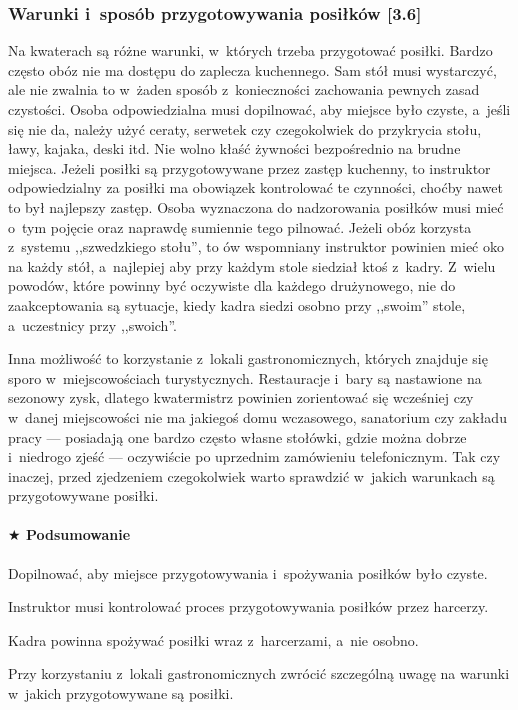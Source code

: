 \documentclass[a5paper,10pt,titlepage,twoside]{article}
\newcommand*{\thecheckbox}{\hss$\Box$} %
\newenvironment*{checklist}
{\list{}{%
\renewcommand*{\makelabel}[1]{\thecheckbox}}}
{\endlist}
\begin{document}
\subsubsection{Warunki i~sposób przygotowywania posiłków [3.6]}
Na kwaterach są różne warunki, w~których trzeba przygotować posiłki. Bardzo często obóz nie ma dostępu do zaplecza kuchennego. Sam stół musi wystarczyć, ale nie zwalnia to w~żaden sposób z~konieczności zachowania pewnych zasad czystości. Osoba odpowiedzialna musi dopilnować, aby miejsce było czyste, a~jeśli się nie da, należy użyć ceraty, serwetek czy czegokolwiek do przykrycia stołu, ławy, kajaka, deski itd. Nie wolno kłaść żywności bezpośrednio na brudne miejsca. Jeżeli posiłki są przygotowywane przez zastęp kuchenny, to instruktor odpowiedzialny za posiłki ma obowiązek kontrolować te czynności, choćby nawet to był najlepszy zastęp. Osoba wyznaczona do nadzorowania posiłków musi mieć o~tym pojęcie oraz naprawdę sumiennie tego pilnować. Jeżeli obóz korzysta z~systemu ,,szwedzkiego stołu'', to ów wspomniany instruktor powinien mieć oko na każdy stół, a~najlepiej aby przy każdym stole siedział ktoś z~kadry. Z~wielu powodów, które powinny być oczywiste dla każdego drużynowego, nie do zaakceptowania są sytuacje, kiedy kadra siedzi osobno przy ,,swoim'' stole, a~uczestnicy przy ,,swoich''.

Inna możliwość to korzystanie z~lokali gastronomicznych, których znajduje się sporo w~miejscowościach turystycznych. Restauracje i~bary są nastawione na sezonowy zysk, dlatego kwatermistrz powinien zorientować się wcześniej czy w~danej miejscowości nie ma jakiegoś domu wczasowego, sanatorium czy zakładu pracy --- posiadają one bardzo często własne stołówki, gdzie można dobrze i~niedrogo zjeść --- oczywiście po uprzednim zamówieniu telefonicznym. Tak czy inaczej, przed zjedzeniem czegokolwiek warto sprawdzić w~jakich warunkach są przygotowywane posiłki.

\paragraph{$\bigstar$ Podsumowanie}
\begin{checklist}
\item Dopilnować, aby miejsce przygotowywania i~spożywania posiłków było czyste.
\item Instruktor musi kontrolować proces przygotowywania posiłków przez harcerzy.
\item Kadra powinna spożywać posiłki wraz z~harcerzami, a~nie osobno.
\item Przy korzystaniu z~lokali gastronomicznych zwrócić szczególną uwagę na warunki w~jakich przygotowywane są posiłki.
\end{checklist}
\end{document}
